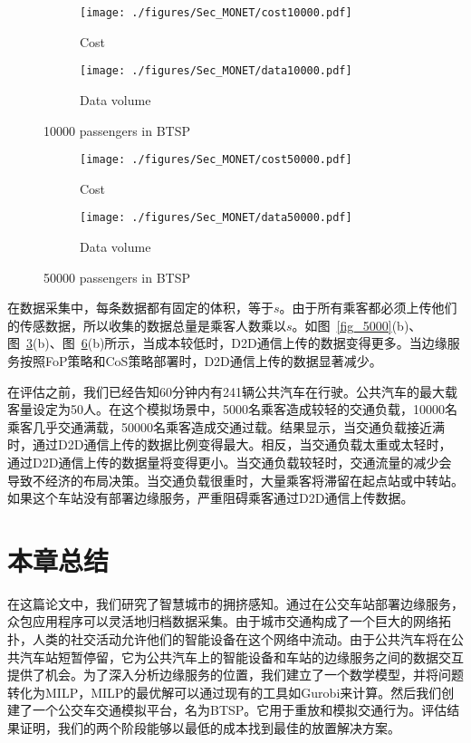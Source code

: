 \begin{figure}[!h]
  \centering
  \begin{subfigure}[b]{0.45\linewidth}
    \texttt{[image: ./figures/Sec\_MONET/cost10000.pdf]}
    \label{fig_cost10000}
    \caption{Cost}
  \end{subfigure}
  \begin{subfigure}[b]{0.45\linewidth}
    \texttt{[image: ./figures/Sec\_MONET/data10000.pdf]}
    \label{fig_data10000}
    \caption{Data volume}
  \end{subfigure}
  \caption{10000 passengers in BTSP}
  \label{fig_10000}
\end{figure}

\begin{figure}[!h]
  \centering
  \begin{subfigure}[b]{0.45\linewidth}
    \texttt{[image: ./figures/Sec\_MONET/cost50000.pdf]}
    \label{fig_cost50000}
    \caption{Cost}
  \end{subfigure}
  \begin{subfigure}[b]{0.45\linewidth}
    \texttt{[image: ./figures/Sec\_MONET/data50000.pdf]}
    \label{fig_data50000}
    \caption{Data volume}
  \end{subfigure}
  \caption{50000 passengers in BTSP}
  \label{fig_50000}
\end{figure}

在数据采集中，每条数据都有固定的体积，等于$s$。由于所有乘客都必须上传他们的传感数据，所以收集的数据总量是乘客人数乘以$s$。如图~\ref{fig_5000}(b)、图~\ref{fig_10000}(b)、图~\ref{fig_50000}(b)所示，当成本较低时，D2D通信上传的数据变得更多。当边缘服务按照FoP策略和CoS策略部署时，D2D通信上传的数据显著减少。

在评估之前，我们已经告知60分钟内有241辆公共汽车在行驶。公共汽车的最大载客量设定为50人。在这个模拟场景中，5000名乘客造成较轻的交通负载，10000名乘客几乎交通满载，50000名乘客造成交通过载。结果显示，当交通负载接近满时，通过D2D通信上传的数据比例变得最大。相反，当交通负载太重或太轻时，通过D2D通信上传的数据量将变得更小。当交通负载较轻时，交通流量的减少会导致不经济的布局决策。当交通负载很重时，大量乘客将滞留在起点站或中转站。如果这个车站没有部署边缘服务，严重阻碍乘客通过D2D通信上传数据。

\section{本章总结}

在这篇论文中，我们研究了智慧城市的拥挤感知。通过在公交车站部署边缘服务，众包应用程序可以灵活地归档数据采集。由于城市交通构成了一个巨大的网络拓扑，人类的社交活动允许他们的智能设备在这个网络中流动。由于公共汽车将在公共汽车站短暂停留，它为公共汽车上的智能设备和车站的边缘服务之间的数据交互提供了机会。为了深入分析边缘服务的位置，我们建立了一个数学模型，并将问题转化为MILP，MILP的最优解可以通过现有的工具如Gurobi来计算。然后我们创建了一个公交车交通模拟平台，名为BTSP。它用于重放和模拟交通行为。评估结果证明，我们的两个阶段能够以最低的成本找到最佳的放置解决方案。

